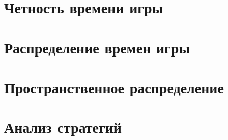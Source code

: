 \section{Четность времени игры}\label{sec:ch3/sec2}

\section{Распределение времен игры}\label{sec:ch3/sec3}

\section{Пространственное распределение}\label{sec:ch3/sec4}

\section{Анализ стратегий}\label{sec:ch3/sec5}


